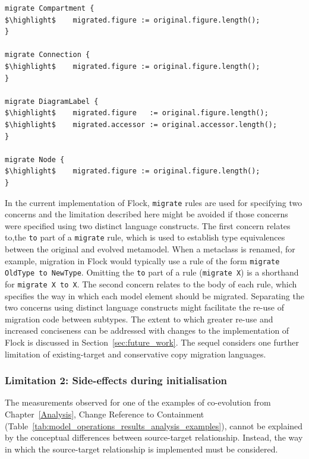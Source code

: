 \begin{lstlisting}[float=tbp, caption=Simplified GMF Graph model migration in Flock, label=lst:graph_flock, language=Flock, tabsize=2]
migrate Compartment {
$\highlight$	migrated.figure := original.figure.length();
}

migrate Connection {
$\highlight$	migrated.figure := original.figure.length();
}

migrate DiagramLabel {
$\highlight$	migrated.figure   := original.figure.length();
$\highlight$	migrated.accessor := original.accessor.length();
}

migrate Node {
$\highlight$	migrated.figure := original.figure.length();
}
\end{lstlisting}

In the current implementation of Flock, \texttt{migrate} rules are used for specifying two concerns and the limitation described here might be avoided if those concerns were specified using two distinct language constructs. The first concern relates to,the \texttt{to} part of a \texttt{migrate} rule, which is used to establish type equivalences between the original and evolved metamodel. When a metaclass is renamed, for example, migration in Flock would typically use a rule of the form \texttt{migrate OldType to NewType}. Omitting the \texttt{to} part of a rule (\texttt{migrate X}) is a shorthand for \texttt{migrate X to X}. The second concern relates to the body of each rule, which specifies the way in which each model element should be migrated. Separating the two concerns using distinct language constructs might facilitate the re-use of migration code between subtypes. The extent to which greater re-use and increased conciseness can be addressed with changes to the implementation of Flock is discussed in Section~\ref{sec:future_work}. The sequel considers one further limitation of existing-target and conservative copy migration languages.

\subsubsection{Limitation 2: Side-effects during initialisation}
The measurements observed for one of the examples of co-evolution from Chapter~\ref{Analysis}, Change Reference to Containment (Table~\ref{tab:model_operations_results_analysis_examples}), cannot be explained by the conceptual differences between source-target relationship. Instead, the way in which the source-target relationship is implemented must be considered.


